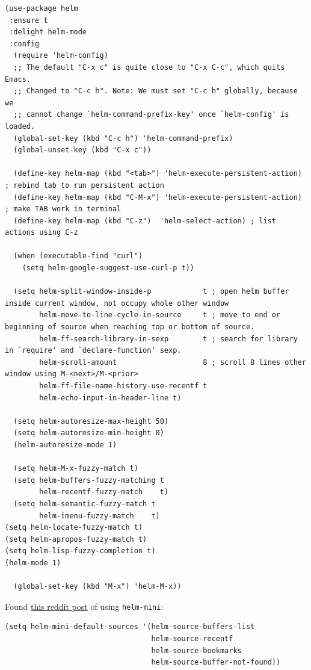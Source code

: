 \documentclass[11pt]{article}
\begin{document}
\begin{verbatim}
(use-package helm
 :ensure t
 :delight helm-mode
 :config
  (require 'helm-config)
  ;; The default "C-x c" is quite close to "C-x C-c", which quits Emacs.
  ;; Changed to "C-c h". Note: We must set "C-c h" globally, because we
  ;; cannot change `helm-command-prefix-key' once `helm-config' is loaded.
  (global-set-key (kbd "C-c h") 'helm-command-prefix)
  (global-unset-key (kbd "C-x c"))

  (define-key helm-map (kbd "<tab>") 'helm-execute-persistent-action) ; rebind tab to run persistent action
  (define-key helm-map (kbd "C-M-x") 'helm-execute-persistent-action) ; make TAB work in terminal
  (define-key helm-map (kbd "C-z")  'helm-select-action) ; list actions using C-z

  (when (executable-find "curl")
    (setq helm-google-suggest-use-curl-p t))

  (setq helm-split-window-inside-p            t ; open helm buffer inside current window, not occupy whole other window
        helm-move-to-line-cycle-in-source     t ; move to end or beginning of source when reaching top or bottom of source.
        helm-ff-search-library-in-sexp        t ; search for library in `require' and `declare-function' sexp.
        helm-scroll-amount                    8 ; scroll 8 lines other window using M-<next>/M-<prior>
        helm-ff-file-name-history-use-recentf t
        helm-echo-input-in-header-line t)

  (setq helm-autoresize-max-height 50)
  (setq helm-autoresize-min-height 0)
  (helm-autoresize-mode 1)

  (setq helm-M-x-fuzzy-match t)
  (setq helm-buffers-fuzzy-matching t
        helm-recentf-fuzzy-match    t)
  (setq helm-semantic-fuzzy-match t
        helm-imenu-fuzzy-match    t)
(setq helm-locate-fuzzy-match t)
(setq helm-apropos-fuzzy-match t)
(setq helm-lisp-fuzzy-completion t)
(helm-mode 1)

  (global-set-key (kbd "M-x") 'helm-M-x))
\end{verbatim}

Found \href{https://www.reddit.com/r/emacs/comments/30yer0/helm\_and\_recentf\_tips/}{this reddit post} of using \texttt{helm-mini}:

\begin{verbatim}
(setq helm-mini-default-sources '(helm-source-buffers-list
                                  helm-source-recentf
                                  helm-source-bookmarks
                                  helm-source-buffer-not-found))
\end{verbatim}
\end{document}
